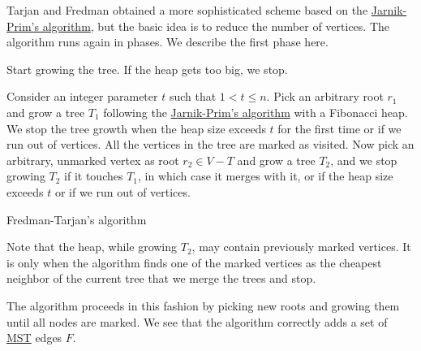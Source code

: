 Tarjan and Fredman obtained a more sophisticated scheme based on the \hyperref[algo:Jarnik-Prim]{Jarnik-Prim's algorithm}, but the basic idea is to reduce the number of vertices. The algorithm runs again in phases. We describe the first phase here.

\begin{intuition}
	Start growing the tree. If the heap gets too big, we stop.
\end{intuition}

Consider an integer  parameter \(t\) such that \(1 < t \leq n\). Pick an arbitrary root \(r_1\) and grow a tree \(T_1\) following the \hyperref[algo:Jarnik-Prim]{Jarnik-Prim's algorithm} with a Fibonacci heap. We stop the tree growth when the heap size exceeds \(t\) for the first time or if we run out of vertices. All the vertices in the tree are marked as visited. Now pick an arbitrary, unmarked vertex as root \(r_2 \in V - T\) and grow a tree \(T_2\), and we stop growing \(T_2\) if it touches \(T_1\), in which case it merges with it, or if the heap size exceeds \(t\) or if we run out of vertices.

\begin{algorithm}[H]\label{algo:Fredman-Tarjan}
	\DontPrintSemicolon
	\caption{Fredman-Tarjan's algorithm}
	\BlankLine


	\;
\end{algorithm}

\begin{note}
	Note that the heap, while growing \(T_2\), may contain previously marked vertices. It is only when the algorithm finds one of the marked vertices as the cheapest neighbor of the current tree that we merge the trees and stop.
\end{note}

The algorithm proceeds in this fashion by picking new roots and growing them until all nodes are marked. We see that the algorithm correctly adds a set of \hyperref[prb:MST]{MST} edges \(F\).

